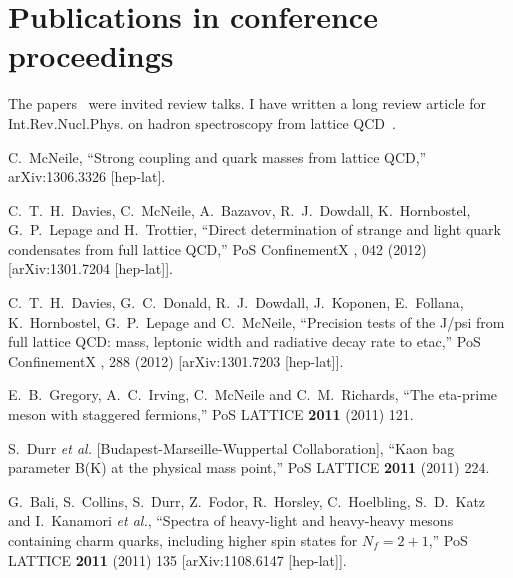 \section{Publications in conference proceedings}

The 
papers~\cite{McNeile:2013rga,McNeile:2008sr,McNeile:2007qf,McNeile:2006wj,McNeile:2002uy,McNeile:2002en,McNeile:2001hy,McNeile:1999gk} 
were invited review
talks. 
I have written a long review article for Int.Rev.Nucl.Phys. 
on hadron spectroscopy from lattice 
QCD~\cite{McNeile:2003dy}.


\begin{thebibliography}{130}

  C.~McNeile,
  ``Strong coupling and quark masses from lattice QCD,''
  arXiv:1306.3326 [hep-lat].

  C.~T.~H.~Davies, C.~McNeile, A.~Bazavov, R.~J.~Dowdall,
  K.~Hornbostel, G.~P.~Lepage and H.~Trottier,
  ``Direct determination of strange and light quark condensates from
  full lattice QCD,''
  PoS ConfinementX {\bf }, 042 (2012)
  [arXiv:1301.7204 [hep-lat]].


  C.~T.~H.~Davies, G.~C.~Donald, R.~J.~Dowdall, J.~Koponen,
  E.~Follana, K.~Hornbostel, G.~P.~Lepage and C.~McNeile,
  ``Precision tests of the J/psi from full lattice QCD: mass,
  leptonic width and radiative decay rate to etac,''
  PoS ConfinementX {\bf }, 288 (2012)
  [arXiv:1301.7203 [hep-lat]].

  E.~B.~Gregory, A.~C.~Irving, C.~McNeile and C.~M.~Richards,
  ``The eta-prime meson with staggered fermions,''
  PoS LATTICE {\bf 2011} (2011) 121.

  S.~Durr {\it et al.}  [Budapest-Marseille-Wuppertal Collaboration],
  ``Kaon bag parameter B(K) at the physical mass point,''
  PoS LATTICE {\bf 2011} (2011) 224.


  G.~Bali, S.~Collins, S.~Durr, Z.~Fodor, R.~Horsley, C.~Hoelbling,
  S.~D.~Katz and I.~Kanamori {\it et al.},
  ``Spectra of heavy-light and heavy-heavy mesons containing charm
  quarks, including higher spin states for $N_f=2+ 1$,''
  PoS LATTICE {\bf 2011} (2011) 135
  [arXiv:1108.6147 [hep-lat]].




\end{thebibliography}
